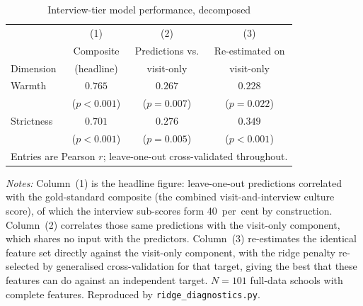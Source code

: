 \begin{table}[htbp]
\centering
\caption{Interview-tier model performance, decomposed}
\label{tab:ridge_circularity}

\small
\begin{tabular}{lccc}
\toprule
 & (1) & (2) & (3) \\
 & Composite & Predictions vs. & Re-estimated on \\
Dimension & (headline) & visit-only & visit-only \\
\midrule
Warmth     & $0.765$ & $0.267$ & $0.228$ \\
           & ($p<0.001$) & ($p=0.007$) & ($p=0.022$) \\
\addlinespace
Strictness & $0.701$ & $0.276$ & $0.349$ \\
           & ($p<0.001$) & ($p=0.005$) & ($p<0.001$) \\
\bottomrule
\multicolumn{4}{l}{\footnotesize Entries are Pearson $r$; leave-one-out
cross-validated throughout.}\\
\end{tabular}
\begin{minipage}{\linewidth}
\smallskip
\footnotesize\textit{Notes:} Column~(1) is the headline figure: leave-one-out predictions correlated with the gold-standard composite (the combined visit-and-interview culture score), of which the interview sub-scores form 40~per~cent by construction. Column~(2) correlates those same predictions with the visit-only component, which shares no input with the predictors. Column~(3) re-estimates the identical feature set directly against the visit-only component, with the ridge penalty re-selected by generalised cross-validation for that target, giving the best that these features can do against an independent target. $N = 101$ full-data schools with complete features. Reproduced by \texttt{ridge\_diagnostics.py}.
\end{minipage}
\end{table}
